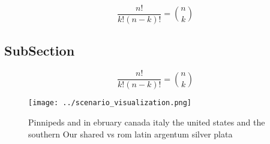 \documentclass[a4paper]{article}
\begin{document}
\[ \frac{n!}{k!(n-k)!} = \binom{n}{k} \]

\subsection{SubSection}

\[ \frac{n!}{k!(n-k)!} = \binom{n}{k} \]

\begin{figure}
\centering
\texttt{[image: ../scenario\_visualization.png]}
\caption{Pinnipeds and in ebruary canada italy the united states and the southern Our shared vs rom latin argentum silver plata 
}
\end{figure}
 
\end{document}
